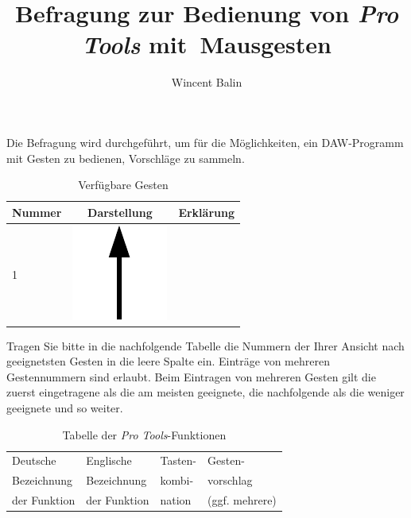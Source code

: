 \documentclass[11pt,a4paper,notitlepage]{article}
\author{Wincent Balin}
\title{Befragung zur Bedienung von \emph{Pro Tools} mit~Mausgesten}
\begin{document}
\maketitle

Die Befragung wird durchgeführt, um für die Möglichkeiten, ein DAW-Programm mit Gesten zu bedienen, Vorschläge zu sammeln.

\begin{table}[ht] \label{tab:Gestures}
\centering
\begin{tabular}{lcl} \toprule
Nummer & Darstellung & Erklärung \\ \midrule \midrule
 1 & \includegraphics[scale=0.25]{img/up} & \\ \midrule
\end{tabular}
\caption{Verfügbare Gesten}
\end{table}

Tragen Sie bitte in die nachfolgende Tabelle die Nummern der Ihrer Ansicht nach geeignetsten Gesten
in die leere Spalte ein. Einträge von mehreren Gestennummern sind erlaubt. Beim Eintragen von mehreren
Gesten gilt die zuerst eingetragene als die am meisten geeignete, die nachfolgende als die weniger geeignete
und so weiter.

\begin{table}[ht] \label{tab:Functions}
\centering
\begin{tabular}{llll} \toprule
Deutsche     & Englische    & Tasten-  & Gesten-        \\
Bezeichnung  & Bezeichnung  & kombi- & vorschlag      \\
der Funktion & der Funktion & nation     & (ggf. mehrere) \\ \midrule \midrule
\end{tabular}
\caption{Tabelle der \emph{Pro Tools}-Funktionen}
\end{table}
\end{document}
